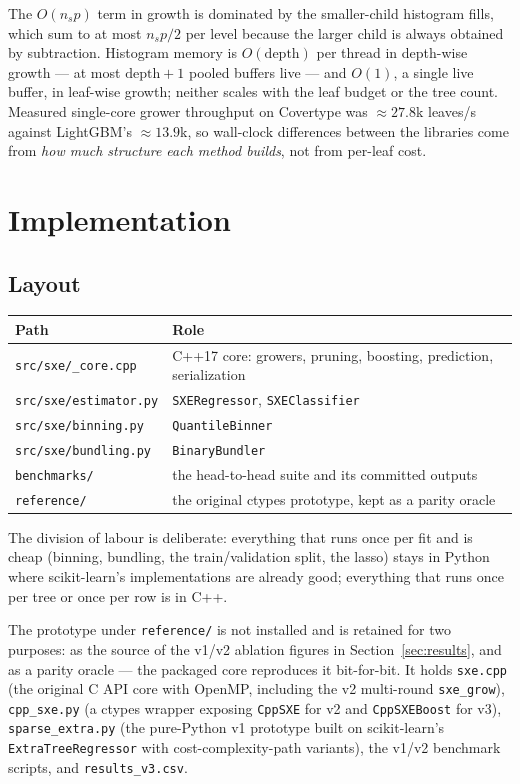 \documentclass[11pt,a4paper]{article}
\newcommand{\code}[1]{\texttt{\small #1}}
\theoremstyle{definition}
\begin{document}
The $O(n_s p)$ term in growth is dominated by the smaller-child histogram fills,
which sum to at most $n_s p / 2$ per level because the larger child is always
obtained by subtraction. Histogram memory is $O(\text{depth})$ per thread in
depth-wise growth --- at most $\text{depth}+1$ pooled buffers live --- and
$O(1)$, a single live buffer, in leaf-wise growth; neither scales with the leaf
budget or the tree count. Measured single-core grower throughput on Covertype
was $\approx 27.8$k leaves/s against LightGBM's $\approx 13.9$k, so wall-clock
differences between the libraries come from \emph{how much structure each
method builds}, not from per-leaf cost.

\section{Implementation}\label{sec:impl}

\subsection{Layout}

\begin{center}
\begin{tabular}{ll}
\toprule
Path & Role \\
\midrule
\code{src/sxe/\_core.cpp} & C++17 core: growers, pruning, boosting, prediction, serialization \\
\code{src/sxe/estimator.py} & \code{SXERegressor}, \code{SXEClassifier} \\
\code{src/sxe/binning.py} & \code{QuantileBinner} \\
\code{src/sxe/bundling.py} & \code{BinaryBundler} \\
\code{benchmarks/} & the head-to-head suite and its committed outputs \\
\code{reference/} & the original ctypes prototype, kept as a parity oracle \\
\bottomrule
\end{tabular}
\end{center}

The division of labour is deliberate: everything that runs once per fit and is
cheap (binning, bundling, the train/validation split, the lasso) stays in
Python where scikit-learn's implementations are already good; everything that
runs once per tree or once per row is in C++.

The prototype under \code{reference/} is not installed and is retained for two
purposes: as the source of the v1/v2 ablation figures in
Section~\ref{sec:results}, and as a parity oracle --- the packaged core
reproduces it bit-for-bit. It holds \code{sxe.cpp} (the original C API core with
OpenMP, including the v2 multi-round \code{sxe\_grow}), \code{cpp\_sxe.py} (a
ctypes wrapper exposing \code{CppSXE} for v2 and \code{CppSXEBoost} for v3),
\code{sparse\_extra.py} (the pure-Python v1 prototype built on scikit-learn's
\code{ExtraTreeRegressor} with cost-complexity-path variants), the v1/v2
benchmark scripts, and \code{results\_v3.csv}.
\end{document}
